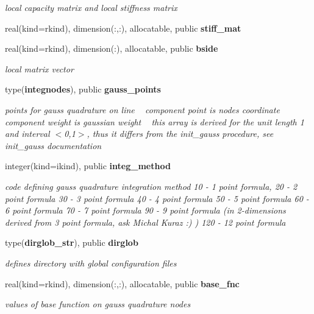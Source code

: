 \begin{DoxyCompactItemize}
\begin{DoxyCompactList}\small\item\em local capacity matrix and local stiffness matrix \end{DoxyCompactList}\item 
real(kind=rkind), dimension(\+:,\+:), allocatable, public {\bf stiff\+\_\+mat}
\item 
real(kind=rkind), dimension(\+:), allocatable, public {\bf bside}
\begin{DoxyCompactList}\small\item\em local matrix vector \end{DoxyCompactList}\item 
type({\bf integnodes}), public {\bf gauss\+\_\+points}
\begin{DoxyCompactList}\small\item\em points for gauss quadrature on line ~\newline
 component point is node\textquotesingle{}s coordinate ~\newline
 component weight is gaussian weight ~\newline
 this array is derived for the unit length 1 and interval $<$0,1$>$, thus it differs from the init\+\_\+gauss procedure, see init\+\_\+gauss documentation \end{DoxyCompactList}\item 
integer(kind=ikind), public {\bf integ\+\_\+method}
\begin{DoxyCompactList}\small\item\em code defining gauss quadrature integration method 10 -\/ 1 point formula, 20 -\/ 2 point formula 30 -\/ 3 point formula 40 -\/ 4 point formula 50 -\/ 5 point formula 60 -\/ 6 point formula 70 -\/ 7 point formula 90 -\/ 9 point formula (in 2-\/dimensions derived from 3 point formula, ask Michal Kuraz \+:) ) 120 -\/ 12 point formula \end{DoxyCompactList}\item 
type({\bf dirglob\+\_\+str}), public {\bf dirglob}
\begin{DoxyCompactList}\small\item\em defines directory with global configuration files \end{DoxyCompactList}\item 
real(kind=rkind), dimension(\+:,\+:), allocatable, public {\bf base\+\_\+fnc}
\begin{DoxyCompactList}\small\item\em values of base function on gauss quadrature nodes \end{DoxyCompactList}\item 

\end{DoxyCompactItemize}
